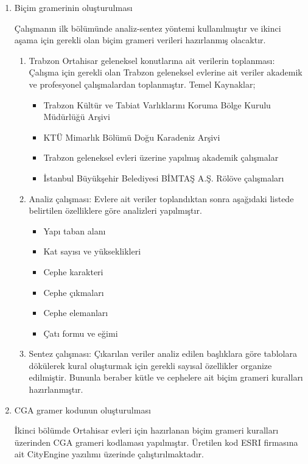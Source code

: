 \documentclass[12pt,turkish,a4paperpaper,]{report}
\providecommand{\tightlist}{%
  \setlength{\itemsep}{0pt}\setlength{\parskip}{0pt}}
\begin{document}
\begin{enumerate}
\def\labelenumi{\arabic{enumi}.}
\item
  Biçim gramerinin oluşturulması

  Çalışmanın ilk bölümünde analiz-sentez yöntemi kullanılmıştır ve
  ikinci aşama için gerekli olan biçim grameri verileri hazırlanmış
  olacaktır.

  \begin{enumerate}
  \def\labelenumii{\arabic{enumii}.}
  \item
    Trabzon Ortahisar geleneksel konutlarına ait verilerin toplanması:
    Çalışma için gerekli olan Trabzon geleneksel evlerine ait veriler
    akademik ve profesyonel çalışmalardan toplanmıştır. Temel Kaynaklar;

    \begin{itemize}
    \tightlist
    \item
      Trabzon Kültür ve Tabiat Varlıklarını Koruma Bölge Kurulu
      Müdürlüğü Arşivi
    \item
      KTÜ Mimarlık Bölümü Doğu Karadeniz Arşivi
    \item
      Trabzon geleneksel evleri üzerine yapılmış akademik çalışmalar
    \item
      İstanbul Büyükşehir Belediyesi BİMTAŞ A.Ş. Rölöve çalışmaları 
    \end{itemize}
  \item
    Analiz çalışması: Evlere ait veriler toplandıktan sonra aşağıdaki
    listede belirtilen özelliklere göre analizleri yapılmıştır.

    \begin{itemize}
    \item
      Yapı taban alanı 
    \item
      Kat sayısı ve yükseklikleri
    \item
      Cephe karakteri
    \item
      Cephe çıkmaları
    \item
      Cephe elemanları
    \item
      Çatı formu ve eğimi
    \end{itemize}
  \item
    Sentez çalışması: Çıkarılan veriler analiz edilen başlıklara göre
    tablolara dökülerek kural oluşturmak için gerekli sayısal özellikler
    organize edilmiştir. Bununla beraber kütle ve cephelere ait biçim
    grameri kuralları hazırlanmıştır.
  \end{enumerate}
\item
  CGA gramer kodunun oluşturulması

  İkinci bölümde Ortahisar evleri için hazırlanan biçim grameri
  kuralları üzerinden CGA grameri kodlaması yapılmıştır. Üretilen kod
  ESRI firmasına ait CityEngine yazılımı üzerinde çalıştırılmaktadır.
\end{enumerate}
\end{document}
